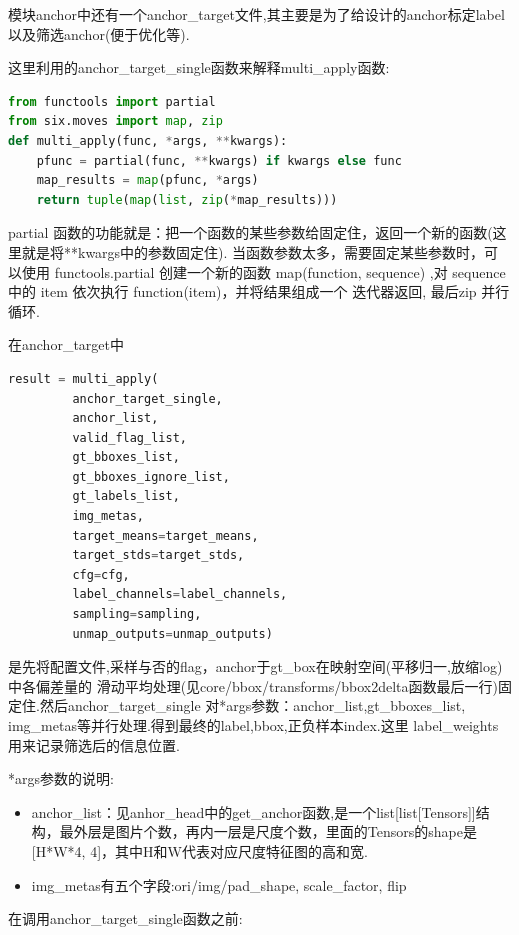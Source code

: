 \documentclass[UTF8]{ctexart}
\begin{document}
模块anchor中还有一个anchor\_target文件,其主要是为了给设计的anchor标定label以及筛选anchor(便于优化等).

这里利用的anchor\_target\_single函数来解释multi\_apply函数:
\lstset{style=mystyle}
\begin{lstlisting}[language=Python]
from functools import partial
from six.moves import map, zip
def multi_apply(func, *args, **kwargs):
    pfunc = partial(func, **kwargs) if kwargs else func
    map_results = map(pfunc, *args)
	return tuple(map(list, zip(*map_results)))
\end{lstlisting}

partial 函数的功能就是：把一个函数的某些参数给固定住，返回一个新的函数(这里就是将**kwargs中的参数固定住).
当函数参数太多，需要固定某些参数时，可以使用 functools.partial 创建一个新的函数
map(function, sequence) ,对 sequence 中的 item 依次执行 function(item)，并将结果组成一个 迭代器返回,
最后zip 并行循环.

在anchor\_target中
\lstset{style=mystyle}
\begin{lstlisting}[language=Python]
result = multi_apply(
         anchor_target_single,
         anchor_list,
         valid_flag_list,
         gt_bboxes_list,
         gt_bboxes_ignore_list,
         gt_labels_list,
         img_metas,
         target_means=target_means,
         target_stds=target_stds,
         cfg=cfg,
         label_channels=label_channels,
         sampling=sampling,
		 unmap_outputs=unmap_outputs)
\end{lstlisting}

是先将配置文件,采样与否的flag，anchor于gt\_box在映射空间(平移归一,放缩log)中各偏差量的
滑动平均处理(见core/bbox/transforms/bbox2delta函数最后一行)固定住.然后anchor\_target\_single
对*args参数：anchor\_list,gt\_bboxes\_list, img\_metas等并行处理.得到最终的label,bbox,正负样本index.这里 label\_weights用来记录筛选后的信息位置.

*args参数的说明:
\begin{itemize}
	\item anchor\_list：见anhor\_head中的get\_anchor函数,是一个list[list[Tensors]]结构，最外层是图片个数，再内一层是尺度个数，里面的Tensors的shape是[H*W*4, 4]，其中H和W代表对应尺度特征图的高和宽.
	\item img\_metas有五个字段:ori/img/pad\_shape, scale\_factor, flip
	
\end{itemize}

在调用anchor\_target\_single函数之前:
\end{document}
